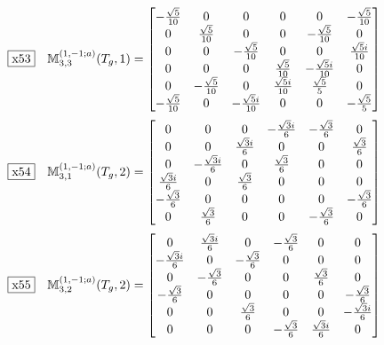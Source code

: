 \documentclass[fleqn,10pt,landscape]{jsarticle}
\begin{document}
\begin{dmath*}
\fbox{x53}\quad \mathbb{M}_{3,3}^{(1,-1;a)}(T_{g},1)=\begin{bmatrix} - \frac{\sqrt{5}}{10} & 0 & 0 & 0 & 0 & - \frac{\sqrt{5}}{10} \\ 0 & \frac{\sqrt{5}}{10} & 0 & 0 & - \frac{\sqrt{5}}{10} & 0 \\ 0 & 0 & - \frac{\sqrt{5}}{10} & 0 & 0 & \frac{\sqrt{5} i}{10} \\ 0 & 0 & 0 & \frac{\sqrt{5}}{10} & - \frac{\sqrt{5} i}{10} & 0 \\ 0 & - \frac{\sqrt{5}}{10} & 0 & \frac{\sqrt{5} i}{10} & \frac{\sqrt{5}}{5} & 0 \\ - \frac{\sqrt{5}}{10} & 0 & - \frac{\sqrt{5} i}{10} & 0 & 0 & - \frac{\sqrt{5}}{5} \end{bmatrix}
\end{dmath*}
\begin{dmath*}
\fbox{x54}\quad \mathbb{M}_{3,1}^{(1,-1;a)}(T_{g},2)=\begin{bmatrix} 0 & 0 & 0 & - \frac{\sqrt{3} i}{6} & - \frac{\sqrt{3}}{6} & 0 \\ 0 & 0 & \frac{\sqrt{3} i}{6} & 0 & 0 & \frac{\sqrt{3}}{6} \\ 0 & - \frac{\sqrt{3} i}{6} & 0 & \frac{\sqrt{3}}{6} & 0 & 0 \\ \frac{\sqrt{3} i}{6} & 0 & \frac{\sqrt{3}}{6} & 0 & 0 & 0 \\ - \frac{\sqrt{3}}{6} & 0 & 0 & 0 & 0 & - \frac{\sqrt{3}}{6} \\ 0 & \frac{\sqrt{3}}{6} & 0 & 0 & - \frac{\sqrt{3}}{6} & 0 \end{bmatrix}
\end{dmath*}
\begin{dmath*}
\fbox{x55}\quad \mathbb{M}_{3,2}^{(1,-1;a)}(T_{g},2)=\begin{bmatrix} 0 & \frac{\sqrt{3} i}{6} & 0 & - \frac{\sqrt{3}}{6} & 0 & 0 \\ - \frac{\sqrt{3} i}{6} & 0 & - \frac{\sqrt{3}}{6} & 0 & 0 & 0 \\ 0 & - \frac{\sqrt{3}}{6} & 0 & 0 & \frac{\sqrt{3}}{6} & 0 \\ - \frac{\sqrt{3}}{6} & 0 & 0 & 0 & 0 & - \frac{\sqrt{3}}{6} \\ 0 & 0 & \frac{\sqrt{3}}{6} & 0 & 0 & - \frac{\sqrt{3} i}{6} \\ 0 & 0 & 0 & - \frac{\sqrt{3}}{6} & \frac{\sqrt{3} i}{6} & 0 \end{bmatrix}
\end{dmath*}
\end{document}
